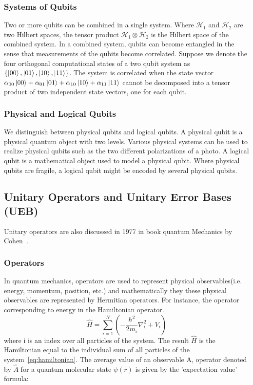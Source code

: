 \subsubsection{Systems of Qubits}
Two or more qubits can be combined in a single system.
Where $\mathcal{H}_1$ and $\mathcal{H}_2$ are two Hilbert spaces, the tensor product $\mathcal{H}_1 \otimes \mathcal{H}_2$ is the Hilbert space of the combined system.
In a combined system, qubits can become entangled in the sense that measurements of the qubits become correlated.
Suppose we denote the four orthogonal computational states of a two qubit system as $\{\ket{00}, \ket{01}, \ket{10}, \ket{11}\}$.
The system is correlated when the state vector $\alpha_{00} \ket{00} + \alpha_{01} \ket{01} + \alpha_{10} \ket{10} + \alpha_{11} \ket{11}$ cannot be decomposed into a tensor product of two independent state vectors, one for each qubit.

\subsubsection{Physical and Logical Qubits}
We distinguish between physical qubits and logical qubits.
A physical qubit is a physical quantum object with two levels.
Various physical systems can be used to realize physical qubits such as the two different polarizations of a photo.
A logical qubit is a mathematical object used to model a physical qubit.
Where physical qubits are fragile, a logical qubit might be encoded by several physical qubits.

\subsection{Unitary Operators and Unitary Error Bases (UEB)}
Unitary operators are also discussed in 1977 in book quantum Mechanics by Cohen~\cite{cohen1977quantummechanics1st}.

\subsubsection{Operators}

In quantum mechanics, operators are used to represent physical observables(i.e. energy, momentum, position, etc.) and mathematically they these physical observables are represented by Hermitian operators. For instance, the operator corresponding to energy in the Hamiltonian operator.
\begin{equation}
\hat{H} = \sum_{i=1}^{N}(-\frac{\hbar^{2}}{2m_{i}}\nabla_{i}^{2}+V_{i})
\label{eq:hamiltonian}
\end{equation}
where i is an index over all particles of the system. The result $\hat{H}$ is the Hamiltonian equal to the individual sum of all particles of the system~\ref{eq:hamiltonian}. The average value of an observable A, operator denoted by $\hat{A}$ for a quantum molecular state $\psi{(r)}$ is given by the 'expectation value' formula:

